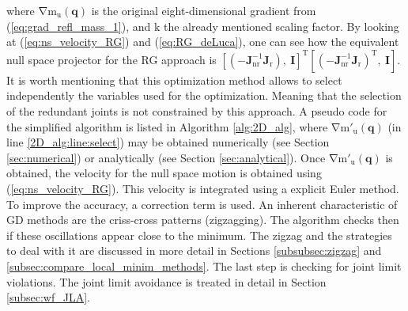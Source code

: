 where $\mathrm{\nabla m_u(\mathbf{q})}$ is the original eight-dimensional gradient from  (\ref{eq:grad_refl_mass_1}), and $\mathrm{k}$ the already mentioned scaling factor. 
By looking at (\ref{eq:ns_velocity_RG}) and (\ref{eq:RG_deLuca}), one can see how the equivalent null space projector for the RG approach is $\mathrm{\left[(-\mathbf{J}_{nr}^{-1} \mathbf{J}_r), \    \mathbf{I} \right ]^{T}  \left[(-\mathbf{J}_{nr}^{-1} \mathbf{J}_r)^{T}, \   \mathbf{I} \right ]  }$. \\
It is worth mentioning that this optimization method allows to select independently the variables used for the optimization. Meaning that the selection of the redundant joints is not constrained by this approach. 
A pseudo code for the simplified algorithm is listed in Algorithm \ref{alg:2D_alg}, where $\mathrm{\nabla m'_u(\mathbf{q})}$ (in line \ref{2D_alg:line:select}) may be obtained numerically (see Section \ref{sec:numerical}) or analytically (see Section \ref{sec:analytical}). Once $\mathrm{\nabla m'_u(\mathbf{q})}$ is obtained, the velocity for the null space motion is obtained using (\ref{eq:ns_velocity_RG}). This velocity is integrated using a explicit Euler method. To improve the accuracy, a correction term is used. An inherent characteristic of GD methods are the criss-cross patterns (zigzagging). The algorithm checks then if these oscillations appear  close to the minimum. The zigzag and the strategies to deal with it are discussed in more detail in Sections \ref{subsubsec:zigzag} and  \ref{subsec:compare_local_minim_methods}.
The last step is checking for joint limit violations. The joint limit avoidance is treated in detail in Section \ref{subsec:wf_JLA}.


